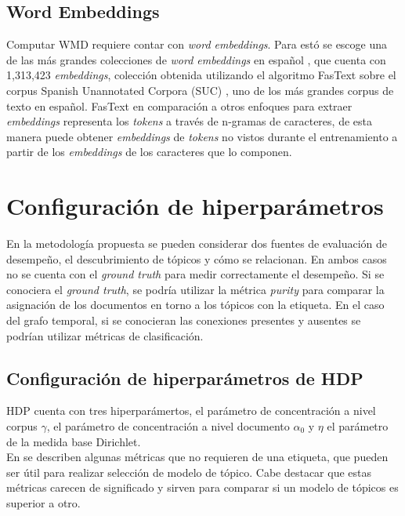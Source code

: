 \subsection{Word Embeddings}
\label{sec:word_embeddings}

Computar WMD requiere contar con \textit{word embeddings}. Para estó se escoge una de las más grandes colecciones de \textit{word embeddings} en español \citep{fastextSUC}, que cuenta con 1,313,423 \textit{embeddings}, colección obtenida utilizando el algoritmo FasText \citep{bojanowski2017enriching} sobre el corpus Spanish Unannotated Corpora (SUC) \citep{josecanneteSUC}, uno de los más grandes corpus de texto en español. FasText en comparación a otros enfoques para extraer \textit{embeddings} representa los \textit{tokens} a través de n-gramas de caracteres, de esta manera puede obtener \textit{embeddings} de \textit{tokens} no vistos durante el entrenamiento a partir de los \textit{embeddings} de los caracteres que lo componen.

\section{Configuración de hiperparámetros}
\label{sec:hiperparameters}

En la metodología propuesta se pueden considerar dos fuentes de evaluación de desempeño, el descubrimiento de tópicos y cómo se relacionan. En ambos casos no se cuenta con el \textit{ground truth} para medir correctamente el desempeño. Si se conociera el \textit{ground truth}, se podría utilizar la métrica \textit{purity} \citep{manning2008introduction} para comparar la asignación de los documentos en torno a los tópicos con la etiqueta. En el caso del grafo temporal, si se conocieran las conexiones presentes y ausentes se podrían utilizar métricas de clasificación.\\

\subsection{Configuración de hiperparámetros de HDP}
\label{sec:hdp_hiperparameters}

HDP cuenta con tres hiperparámertos, el parámetro de concentración a nivel corpus $\gamma$, el parámetro de concentración a nivel documento $\alpha_{0}$ y $\eta$ el parámetro de la medida base Dirichlet.\\

En \citep{blei2003latent,griffiths2004finding,cao2009density,arun2010finding,deveaud2014accurate,zhang2017lda} se describen algunas métricas que no requieren de una etiqueta, que pueden ser útil para realizar selección de modelo de tópico. Cabe destacar que estas métricas carecen de significado y sirven para comparar si un modelo de tópicos es superior a otro.\\

